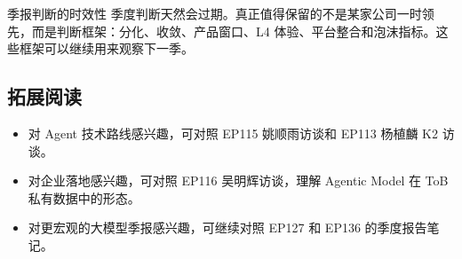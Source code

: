 \begin{warningbox}{季报判断的时效性}
季度判断天然会过期。真正值得保留的不是某家公司一时领先，而是判断框架：分化、收敛、产品窗口、L4 体验、平台整合和泡沫指标。这些框架可以继续用来观察下一季。
\end{warningbox}

\subsection{拓展阅读}

\begin{itemize}
\item 对 Agent 技术路线感兴趣，可对照 EP115 姚顺雨访谈和 EP113 杨植麟 K2 访谈。
\item 对企业落地感兴趣，可对照 EP116 吴明辉访谈，理解 Agentic Model 在 ToB 私有数据中的形态。
\item 对更宏观的大模型季报感兴趣，可继续对照 EP127 和 EP136 的季度报告笔记。
\end{itemize}


